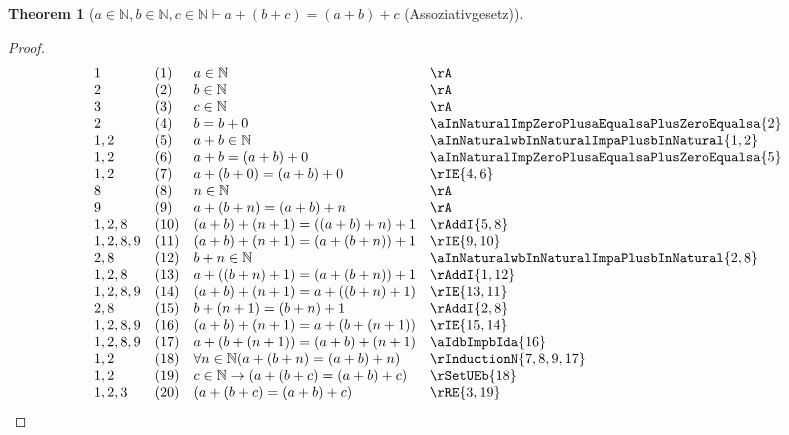 \documentclass{book}
\theoremstyle{plain}
\newtheorem{theorem}{Theorem}
\theoremstyle{remark}
\theoremstyle{definition}
\begin{document}
\label{aInNaturalwbInNaturalwcInNaturalImpaPlusLpbPluscRpEqualsLpaPlusbRpPlusc}
\begin{theorem}[\(a\in\mathbb{N}, b\in\mathbb{N}, c\in\mathbb{N}\vdash a+(b+c)=(a+b)+c\) (Assoziativgesetz)]
\end{theorem}
\begin{proof}
    \[
	\begin{array}{llll}
            1   &  (1) & a\in\mathbb{N} & \rA \\
            2   &  (2) & b\in\mathbb{N} & \rA \\
            3   &  (3) & c\in\mathbb{N} & \rA \\
            2   &  (4) & b = b + 0 & \aInNaturalImpZeroPlusaEqualsaPlusZeroEqualsa{2}  \\
            1,2 &  (5) & a+b\in\mathbb{N} & \aInNaturalwbInNaturalImpaPlusbInNatural{1,2}  \\
            1,2  &  (6) & a+b = (a+b) + 0 & \aInNaturalImpZeroPlusaEqualsaPlusZeroEqualsa{5}  \\
            1,2  &  (7) & a+(b+0) = (a+b) + 0 & \rIE{4,6}  \\
            8  &  (8) & n\in\mathbb{N} & \rA  \\
            9  &  (9) & a+(b+n)=(a+b)+n & \rA  \\
            1,2,8  &  (10) & (a+b)+(n+1) = ((a+b)+n)+1 & \rAddI{5,8}  \\
            1,2,8,9  &  (11) & (a+b)+(n+1) = (a+(b+n))+1 & \rIE{9,10}  \\
            2,8  &  (12) & b+n\in\mathbb{N} & \aInNaturalwbInNaturalImpaPlusbInNatural{2,8}  \\
            1,2,8  &  (13) & a+((b+n)+1)=(a+(b+n))+1 & \rAddI{1,12}  \\
            1,2,8,9  &  (14) & (a+b)+(n+1)=a+((b+n)+1) & \rIE{13,11}  \\
            2,8    &  (15) & b+(n+1)=(b+n)+1 & \rAddI{2,8}  \\
            1,2,8,9    &  (16) & (a+b)+(n+1)=a+(b+(n+1)) & \rIE{15,14}  \\
            1,2,8,9    &  (17) & a+(b+(n+1))=(a+b)+(n+1) & \aIdbImpbIda{16}  \\
            1,2    &  (18) & \forall n\in\mathbb{N}(a+(b+n)=(a+b)+n) & \rInductionN{7,8,9,17}  \\
            1,2    &  (19) & c\in\mathbb{N}\rightarrow (a+(b+c)=(a+b)+c) & \rSetUEb{18}  \\
            1,2,3   &  (20) & (a+(b+c)=(a+b)+c) & \rRE{3,19}  \\
	\end{array}
	\]
\end{proof}
\end{document}
